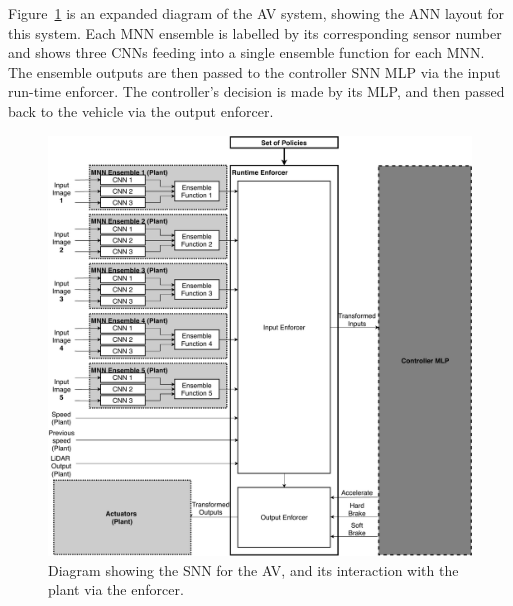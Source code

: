 Figure~\ref{fig:avmnn} is an expanded diagram of the \ac{AV} system, showing the \ac{ANN} layout for this system.
Each \ac{MNN} ensemble is labelled by its corresponding sensor number and shows three \acp{CNN} feeding into a single ensemble function for each \ac{MNN}.
The ensemble outputs are then passed to the controller \ac{SNN} \ac{MLP} via the input run-time enforcer.
The controller's decision is made by its \ac{MLP}, and then passed back to the vehicle via the output enforcer.

\begin{figure}[H]
	\centering
	\includegraphics[width=\textwidth]{Content/fig/AV-MNN.pdf}
	\caption{Diagram showing the \ac{SNN} for the \ac{AV}, and its interaction with the plant via the enforcer. \label{fig:avmnn}}
\end{figure}

